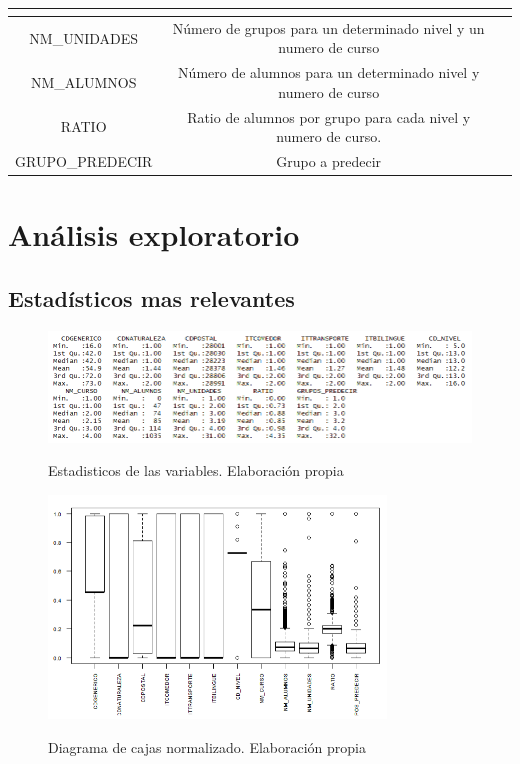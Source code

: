 \begin{subappendices}
\begin{table}[!ht]
{\begin{tabular}{|c|c|c|}
\begin{minipage}[t]{0.4\textwidth}
\begin{itemize}
				\end{itemize}
			\end{minipage}\\ 
			\hline 
			NM\_UNIDADES & Número de grupos para un determinado nivel y un numero de curso &  \\ 
			\hline 
			NM\_ALUMNOS & Número de alumnos para un determinado nivel y numero de curso &  \\ 
			\hline 
			RATIO & Ratio de alumnos por grupo para cada nivel y numero de curso. &  \\ 
			\hline 
			GRUPO\_PREDECIR & Grupo a predecir  &  \\ 
			\hline 
	\end{tabular}}
	
	\label{tab:TablaVariables}
\end{table}

\section{Análisis exploratorio}
\subsection{Estadísticos mas relevantes}
\begin{figure}[htb]
	\centering
	\caption{Estadisticos de las variables. Elaboración propia}
	\includegraphics[width=1\textwidth]{recursos/ImagenesR/estadisticos}
	\label{fig:estadisticos}
\end{figure}
\FloatBarrier

\begin{figure}[htb]
	\centering
	\caption{Diagrama de cajas normalizado. Elaboración propia}
	\includegraphics[width=0.8\textwidth]{recursos/ImagenesR/boxplotNorm}
	\label{fig:boxplotNorm}
\end{figure}
\FloatBarrier


\end{subappendices}
